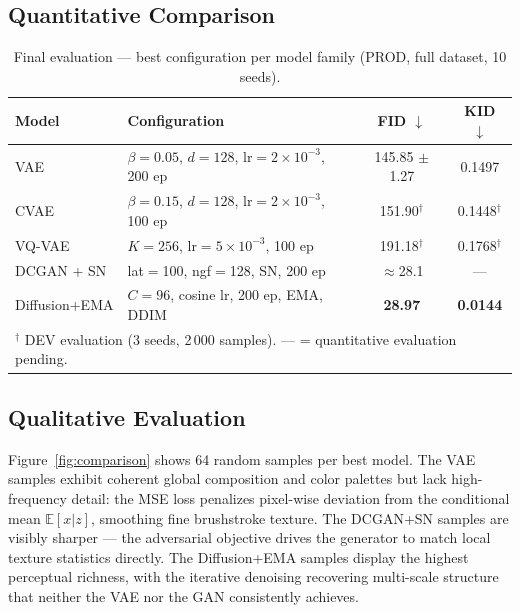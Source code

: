 \documentclass[runningheads]{llncs}
\begin{document}
\subsection{Quantitative Comparison}

\begin{table}[htbp]
\caption{Final evaluation — best configuration per model family (PROD, full dataset, 10 seeds).}\label{tab:main_results}
\centering
\begin{tabular}{llcc}
\toprule
Model & Configuration & FID $\downarrow$ & KID $\downarrow$ \\
\midrule
VAE           & $\beta{=}0.05$, $d{=}128$, lr$=2{\times}10^{-3}$, 200 ep & 145.85 $\pm$ 1.27 & 0.1497 \\
CVAE          & $\beta{=}0.15$, $d{=}128$, lr$=2{\times}10^{-3}$, 100 ep  & 151.90$^\dagger$ & 0.1448$^\dagger$ \\
VQ-VAE        & $K{=}256$, lr$=5{\times}10^{-3}$, 100 ep                  & 191.18$^\dagger$ & 0.1768$^\dagger$ \\
DCGAN + SN    & lat$=$100, ngf$=$128, SN, 200 ep                          & $\approx$28.1 & — \\
Diffusion+EMA & $C{=}96$, cosine lr, 200 ep, EMA, DDIM                    & \textbf{28.97} & \textbf{0.0144} \\
\bottomrule
\multicolumn{4}{l}{\small $^\dagger$ DEV evaluation (3 seeds, 2\,000 samples). — = quantitative evaluation pending.} \\
\end{tabular}
\end{table}

\subsection{Qualitative Evaluation}


Figure~\ref{fig:comparison} shows 64 random samples per best model. The VAE samples exhibit coherent global composition and color palettes but lack high-frequency detail: the MSE loss penalizes pixel-wise deviation from the conditional mean $\mathbb{E}[x|z]$, smoothing fine brushstroke texture. The DCGAN+SN samples are visibly sharper — the adversarial objective drives the generator to match local texture statistics directly. The Diffusion+EMA samples display the highest perceptual richness, with the iterative denoising recovering multi-scale structure that neither the VAE nor the GAN consistently achieves.
\end{document}
